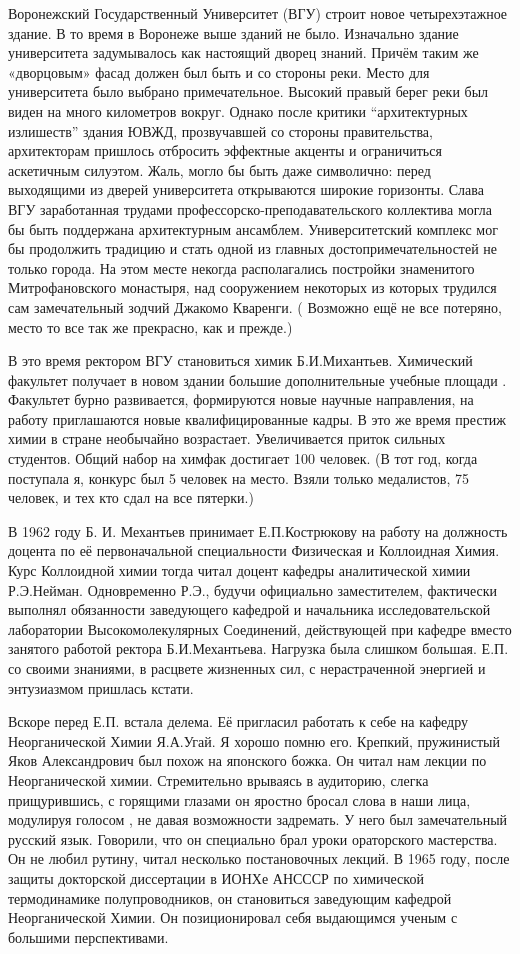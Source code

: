 Воронежский Государственный Университет (ВГУ) строит новое четырехэтажное здание. В то время в Воронеже выше зданий не было. Изначально здание университета задумывалось как настоящий дворец знаний. Причём таким же «дворцовым» фасад должен был быть и со стороны реки. Место для университета было выбрано примечательное. Высокий правый берег реки был виден на много километров вокруг. Однако после критики “архитектурных излишеств” здания ЮВЖД, прозвучавшей со стороны правительства, архитекторам пришлось отбросить эффектные акценты и ограничиться аскетичным силуэтом. Жаль, могло бы быть даже символично: перед выходящими из дверей университета открываются широкие горизонты. Слава ВГУ заработанная трудами профессорско-преподавательского коллектива могла бы быть поддержана архитектурным ансамблем. Университетский комплекс мог бы продолжить традицию и стать одной из главных достопримечательностей не только города. На этом месте некогда располагались постройки знаменитого Митрофановского монастыря, над сооружением некоторых из которых трудился сам замечательный зодчий Джакомо Кваренги. ( Возможно ещё не все потеряно, место то все так же прекрасно, как и прежде.)

В это время ректором ВГУ становиться химик Б.И.Михантьев. Химический факультет получает в новом здании большие дополнительные учебные площади . Факультет бурно развивается, формируются новые научные направления, на работу приглашаются новые квалифицированные кадры. В это же время престиж химии в стране необычайно возрастает. Увеличивается приток сильных студентов. Общий набор на химфак достигает 100 человек. (В тот год, когда поступала я, конкурс был 5 человек на место. Взяли только медалистов, 75 человек, и тех кто сдал на все пятерки.)

В 1962 году Б. И. Механтьев принимает Е.П.Кострюкову на работу на должность доцента по её первоначальной специальности Физическая и Коллоидная Химия. Курс Коллоидной химии тогда читал доцент кафедры аналитической химии Р.Э.Нейман. Одновременно Р.Э., будучи официально заместителем, фактически выполнял обязанности заведующего кафедрой и начальника исследовательской лаборатории Высокомолекулярных Соединений, действующей при кафедре вместо занятого работой ректора Б.И.Механтьева. Нагрузка была слишком большая. Е.П. со своими знаниями, в расцвете жизненных сил, с нерастраченной энергией и энтузиазмом пришлась кстати.

Вскоре перед Е.П. встала делема. Её пригласил работать к себе на кафедру Неорганической Химии Я.А.Угай. Я хорошо помню его. Крепкий, пружинистый Яков Александрович был похож на японского божка. Он читал нам лекции по Неорганической химии. Стремительно врываясь в аудиторию, слегка прищурившись, с горящими глазами он яростно бросал слова в наши лица, модулируя голосом , не давая возможности задремать. У него был замечательный русский язык. Говорили, что он специально брал уроки ораторского мастерства. Он не любил рутину, читал несколько постановочных лекций. В 1965 году, после защиты докторской диссертации в ИОНХе АНСССР по химической термодинамике полупроводников, он становиться заведующим кафедрой Неорганической Химии. Он позиционировал себя выдающимся ученым с большими перспективами.

